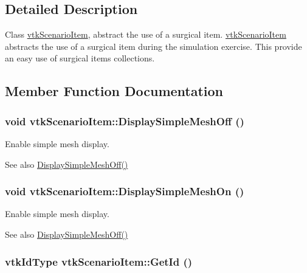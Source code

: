 \subsection{Detailed Description}
Class \hyperlink{classvtkScenarioItem}{vtkScenarioItem}, abstract the use of a surgical item. \hyperlink{classvtkScenarioItem}{vtkScenarioItem} abstracts the use of a surgical item during the simulation exercise. This provide an easy use of surgical items collections. 

\subsection{Member Function Documentation}
\hypertarget{classvtkScenarioItem_ab8c3d0fa282116ca0144cd8fba9545c0}{
\subsubsection[{DisplaySimpleMeshOff}]{\setlength{\rightskip}{0pt plus 5cm}void vtkScenarioItem::DisplaySimpleMeshOff ()}}
\label{classvtkScenarioItem_ab8c3d0fa282116ca0144cd8fba9545c0}


Enable simple mesh display. 

\begin{DoxySeeAlso}{See also}
\hyperlink{classvtkScenarioItem_ab8c3d0fa282116ca0144cd8fba9545c0}{DisplaySimpleMeshOff()} 
\end{DoxySeeAlso}
\hypertarget{classvtkScenarioItem_a9bd7ffa58d7ed0c8f577d127c1654641}{
\subsubsection[{DisplaySimpleMeshOn}]{\setlength{\rightskip}{0pt plus 5cm}void vtkScenarioItem::DisplaySimpleMeshOn ()}}
\label{classvtkScenarioItem_a9bd7ffa58d7ed0c8f577d127c1654641}


Enable simple mesh display. 

\begin{DoxySeeAlso}{See also}
\hyperlink{classvtkScenarioItem_ab8c3d0fa282116ca0144cd8fba9545c0}{DisplaySimpleMeshOff()} 
\end{DoxySeeAlso}
\hypertarget{classvtkScenarioItem_a9884061bd42ee058291d95a67ddcac20}{
\subsubsection[{GetId}]{\setlength{\rightskip}{0pt plus 5cm}vtkIdType vtkScenarioItem::GetId ()}}
\label{classvtkScenarioItem_a9884061bd42ee058291d95a67ddcac20}


